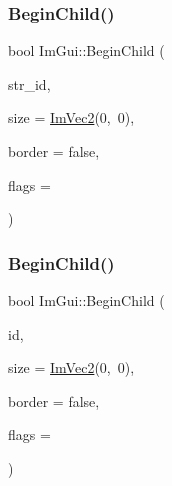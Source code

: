 \mbox{\label{namespaceImGui_a5db08f552118a1f946e19b5933dce181}} 
\subsubsection{\texorpdfstring{Begin\+Child()}{BeginChild()}\hspace{0.1cm}{\footnotesize\ttfamily [1/2]}}
{\footnotesize\ttfamily bool Im\+Gui\+::\+Begin\+Child (\begin{DoxyParamCaption}\item[{const char $\ast$}]{str\+\_\+id,  }\item[{const \hyperlink{structImVec2}{Im\+Vec2} \&}]{size = {\ttfamily \hyperlink{structImVec2}{Im\+Vec2}(0,~0)},  }\item[{bool}]{border = {\ttfamily false},  }\item[{Im\+Gui\+Window\+Flags}]{flags = {} }\end{DoxyParamCaption})}

\mbox{\label{namespaceImGui_a7001666723434ae00316b8a0160e7de0}} 
\subsubsection{\texorpdfstring{Begin\+Child()}{BeginChild()}\hspace{0.1cm}{\footnotesize\ttfamily [2/2]}}
{\footnotesize\ttfamily bool Im\+Gui\+::\+Begin\+Child (\begin{DoxyParamCaption}\item[{Im\+Gui\+ID}]{id,  }\item[{const \hyperlink{structImVec2}{Im\+Vec2} \&}]{size = {\ttfamily \hyperlink{structImVec2}{Im\+Vec2}(0,~0)},  }\item[{bool}]{border = {\ttfamily false},  }\item[{Im\+Gui\+Window\+Flags}]{flags = {} }\end{DoxyParamCaption})}

\mbox{\label{namespaceImGui_a63a223ce2138538300e5b0654d7407a9}} 
